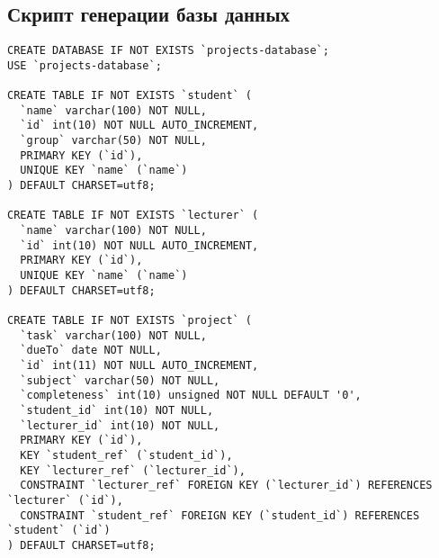 \subsection{Скрипт генерации базы данных}
\begin{verbatim}
CREATE DATABASE IF NOT EXISTS `projects-database`;
USE `projects-database`;

CREATE TABLE IF NOT EXISTS `student` (
  `name` varchar(100) NOT NULL,
  `id` int(10) NOT NULL AUTO_INCREMENT,
  `group` varchar(50) NOT NULL,
  PRIMARY KEY (`id`),
  UNIQUE KEY `name` (`name`)
) DEFAULT CHARSET=utf8;

CREATE TABLE IF NOT EXISTS `lecturer` (
  `name` varchar(100) NOT NULL,
  `id` int(10) NOT NULL AUTO_INCREMENT,
  PRIMARY KEY (`id`),
  UNIQUE KEY `name` (`name`)
) DEFAULT CHARSET=utf8;

CREATE TABLE IF NOT EXISTS `project` (
  `task` varchar(100) NOT NULL,
  `dueTo` date NOT NULL,
  `id` int(11) NOT NULL AUTO_INCREMENT,
  `subject` varchar(50) NOT NULL,
  `completeness` int(10) unsigned NOT NULL DEFAULT '0',
  `student_id` int(10) NOT NULL,
  `lecturer_id` int(10) NOT NULL,
  PRIMARY KEY (`id`),
  KEY `student_ref` (`student_id`),
  KEY `lecturer_ref` (`lecturer_id`),
  CONSTRAINT `lecturer_ref` FOREIGN KEY (`lecturer_id`) REFERENCES `lecturer` (`id`),
  CONSTRAINT `student_ref` FOREIGN KEY (`student_id`) REFERENCES `student` (`id`)
) DEFAULT CHARSET=utf8;
\end{verbatim}